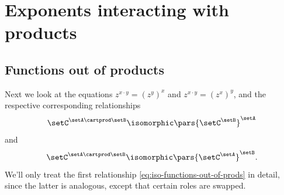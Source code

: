 


\section{Exponents interacting with products}
\label{sec:arithmetic-exponents-products}


\subsection{Functions out of products}

Next we look at the equations $z^{x \cdot y} = (z^y)^x$ and $z^{x \cdot y} = (z^x)^y$, and the respective corresponding relationships
\begin{equation}\label{eq:iso-functions-out-of-prods}
    \setC^{\setA \cartprod \setB}  \isomorphic \pars{\setC^\setB}^\setA
\end{equation}
and
\begin{equation}
    \setC^{\setA \cartprod \setB}  \isomorphic \pars{\setC^\setA}^\setB.
\end{equation}
We'll only treat the first relationship \cref{eq:iso-functions-out-of-prods} in detail, since the latter is analogous, except that certain roles are swapped.

